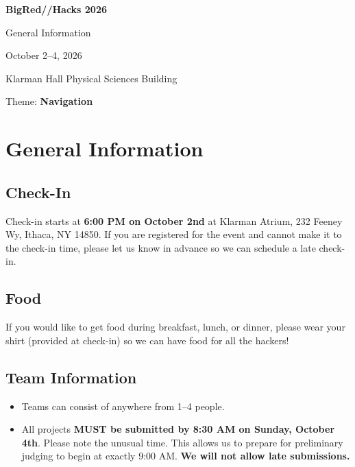 \documentclass[11pt]{article}
\newcommand{\important}[1]{\textbf{\color{bigred}#1}}
\begin{document}
\begin{titlepage}
  \centering
  \vspace*{2in}
  {\Huge\bfseries\color{bigred} BigRed//Hacks 2026\par}
  \vspace{0.5em}
  {\Large General Information\par}
  \vspace{1.5em}
  {\large October 2--4, 2026\par}
  {\large Klarman Hall \textbar{} Physical Sciences Building\par}
  \vspace{1.5em}
  {\large Theme: \textbf{Navigation}\par}
\end{titlepage}

\tableofcontents
\newpage

\section{General Information}

\subsection*{Check-In}
Check-in starts at \textbf{6:00 PM on October 2nd} at Klarman Atrium,
232 Feeney Wy, Ithaca, NY 14850. If you are registered for the event and
cannot make it to the check-in time, please let us know in advance so we can
schedule a late check-in.

\subsection*{Food}
If you would like to get food during breakfast, lunch, or dinner, please wear
your shirt (provided at check-in) so we can have food for all the hackers!

\subsection*{Team Information}
\begin{itemize}
  \item Teams can consist of anywhere from 1--4 people.
  \item All projects \important{MUST be submitted by 8:30 AM on Sunday, October 4th}.
        Please note the unusual time. This allows us to prepare for preliminary
        judging to begin at exactly 9:00 AM. \important{We will not allow late submissions.}
\end{itemize}
\end{document}
